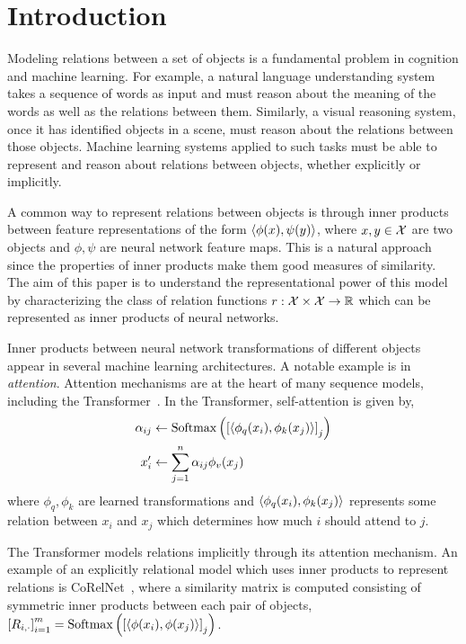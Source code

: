 \section{Introduction}\label{sec:intro}

Modeling relations between a set of objects is a fundamental problem in cognition and machine learning. For example, a natural language understanding system takes a sequence of words as input and must reason about the meaning of the words as well as the relations between them. Similarly, a visual reasoning system, once it has identified objects in a scene, must reason about the relations between those objects. Machine learning systems applied to such tasks must be able to represent and reason about relations between objects, whether explicitly or implicitly.

A common way to represent relations between objects is through inner products between feature representations of the form $\left \langle \phi(x), \psi(y) \right\rangle$, where $x, y \in {\mathcal{X}}$ are two objects and $\phi, \psi$ are neural network feature maps. This is a natural approach since the properties of inner products make them good measures of similarity. The aim of this paper is to understand the representational power of this model by characterizing the class of relation functions $r: {\mathcal{X}} \times {\mathcal{X}} \to \mathbb{R}$ which can be represented as inner products of neural networks.

Inner products between neural network transformations of different objects appear in several machine learning architectures. A notable example is in \textit{attention}. Attention mechanisms are at the heart of many sequence models, including the Transformer~\parencite{vaswani2017attention}. In the Transformer, self-attention is given by,
\begin{equation*}
    \begin{split}
        \alpha_{ij} &\gets \mathrm{Softmax}\left(\left[\left \langle \phi_q(x_i), \phi_k(x_j) \right\rangle\right]_j\right)\\
        x_i' &\gets \sum_{j=1}^{n} \alpha_{ij} \phi_v(x_j)
    \end{split}
\end{equation*}
where $\phi_q, \phi_k$ are learned transformations and $\left \langle \phi_q(x_i), \phi_k(x_j) \right\rangle$ represents some relation between $x_i$ and $x_j$ which determines how much $i$ should attend to $j$.

The Transformer models relations implicitly through its attention mechanism. An example of an explicitly relational model which uses inner products to represent relations is CoRelNet~\parencite{kergNeuralArchitecture2022}, where a similarity matrix is computed consisting of symmetric inner products between each pair of objects, $\left[R_{i,\cdot}\right]_{i=1}^m = \mathrm{Softmax}\left(\left[\left \langle \phi(x_i), \phi(x_j) \right\rangle\right]_j\right)$.


